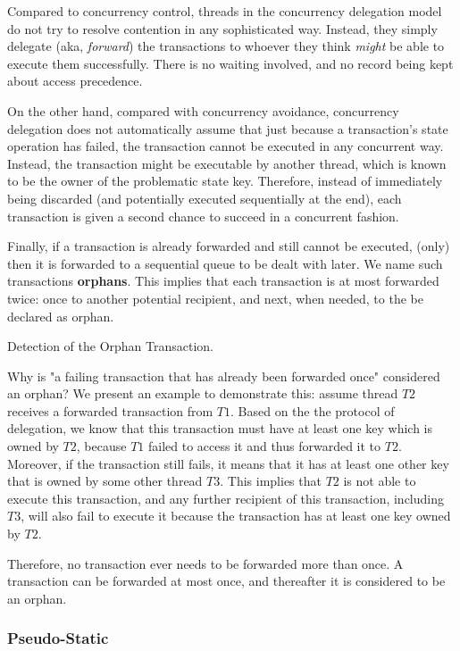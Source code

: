 Compared to concurrency control, threads in the concurrency delegation model do not try to resolve
contention in any sophisticated way. Instead, they simply delegate (aka, \textit{forward}) the
transactions to whoever they think \textit{might} be able to execute them successfully. There is no
waiting involved, and no record being kept about access precedence.

On the other hand, compared with concurrency avoidance, concurrency delegation does not
automatically assume that just because a transaction's state operation has failed, the transaction
cannot be executed in any concurrent way. Instead, the transaction might be executable by another
thread, which is known to be the owner of the problematic state key. Therefore, instead of
immediately being discarded (and potentially executed sequentially at the end), each transaction is
given a second chance to succeed in a concurrent fashion.

Finally, if a transaction is already forwarded and still cannot be executed, (only) then it is
forwarded to a sequential queue to be dealt with later. We name such transactions \textbf{orphans}.
This implies that each transaction is at most forwarded twice: once to another potential recipient,
and next, when needed, to the be declared as orphan.

\begin{lemma}
	Detection of the Orphan Transaction.

	Why is "a failing transaction that has already been forwarded once" considered an orphan? We
	present an example to demonstrate this: assume thread $T2$ receives a forwarded transaction from
	$T1$. Based on the the protocol of delegation, we know that this transaction must have at least
	one key which is owned by $T2$, because $T1$ failed to access it and thus forwarded it to $T2$.
	Moreover, if the transaction still fails, it means that it has at least one other key that is
	owned by some other thread $T3$. This implies that $T2$ is not able to execute this
	transaction, and any further recipient of this transaction, including $T3$, will also fail to
	execute it because the transaction has at least one key owned by $T2$.

	Therefore, no transaction ever needs to be forwarded more than once. A transaction can be
	forwarded at most once, and thereafter it is considered to be an orphan.
\end{lemma}

\subsubsection{Pseudo-Static}

